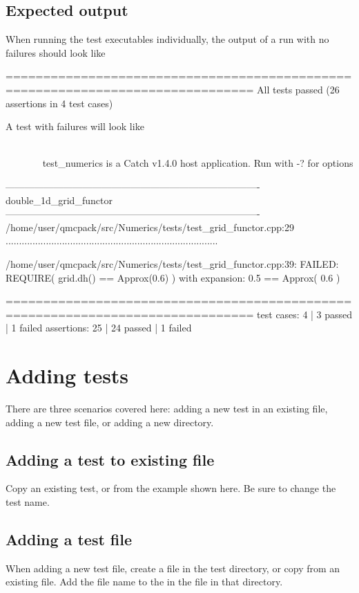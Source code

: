 \subsection{Expected output}

When running the test executables individually, the output of a run with no failures should look like
\begin{shade}
===============================================================================
All tests passed (26 assertions in 4 test cases)
\end{shade}

A test with failures will look like

\begin{minipage}{\linewidth}
\begin{shade}
~~~~~~~~~~~~~~~~~~~~~~~~~~~~~~~~~~~~~~~~~~~~~~~~~~~~~~~~~~~~~~~~~~~~~~~~~~~~~~~
test_numerics is a Catch v1.4.0 host application.
Run with -? for options

-------------------------------------------------------------------------------
double_1d_grid_functor
-------------------------------------------------------------------------------
/home/user/qmcpack/src/Numerics/tests/test_grid_functor.cpp:29
...............................................................................

/home/user/qmcpack/src/Numerics/tests/test_grid_functor.cpp:39: FAILED:
  REQUIRE( grid.dh() == Approx(0.6) )
with expansion:
  0.5 == Approx( 0.6 )

===============================================================================
test cases:  4 |  3 passed | 1 failed
assertions: 25 | 24 passed | 1 failed
\end{shade}
\end{minipage}


\section{Adding tests}
There are three scenarios covered here: adding a new test in an existing file, adding a new test file, or adding a new  directory.

\subsection{Adding a test to existing file}
Copy an existing test, or from the example shown here.  Be sure to change the test name.

\subsection{Adding a test file}
When adding a new test file,
create a file in the test directory, or copy from an existing file.  Add the file name to the  in the  file in that directory.

